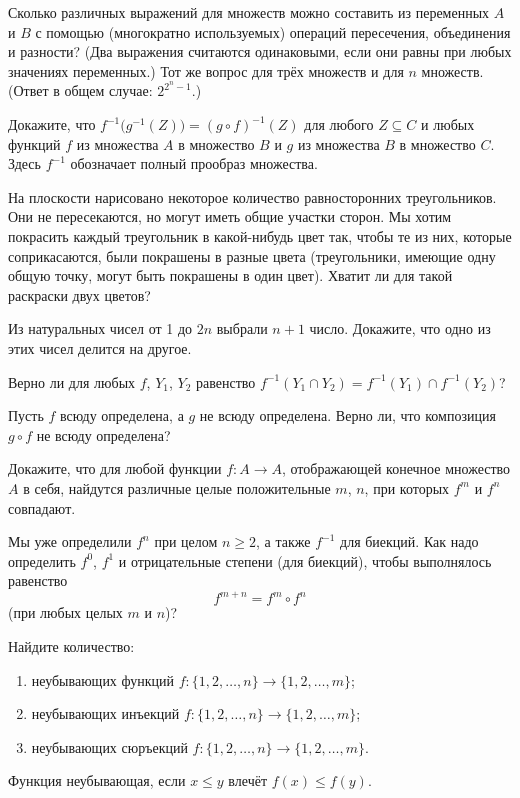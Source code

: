 \begin{problems}
\item Сколько различных выражений для множеств можно составить из переменных $A$ и $B$ с помощью (многократно используемых) операций пересечения, объединения и разности? (Два выражения считаются одинаковыми, если они равны при любых значениях переменных.) Тот же вопрос для трёх множеств и для $n$ множеств. (Ответ в общем случае: $2^{2^n-1}$.)

\item Докажите, что $f^{-1}\bigl(g^{-1}(Z)\bigr)=(g\circ f)^{-1}(Z)$ для любого $Z\subseteq C$ и любых функций $f$ из множества $A$ в множество $B$ и $g$ из множества $B$ в множество $C$. Здесь $f^{-1}$ обозначает полный прообраз множества.

\item На плоскости нарисовано некоторое количество равносторонних треугольников. Они не пересекаются, но могут иметь общие участки сторон. Мы хотим покрасить каждый треугольник в какой-нибудь цвет так, чтобы те из них, которые соприкасаются, были покрашены в разные цвета (треугольники, имеющие одну общую точку, могут быть покрашены в один цвет). Хватит ли для такой раскраски двух цветов?

\item Из натуральных чисел от 1 до $2n$ выбрали $n+1$ число. Докажите, что одно из этих чисел делится на другое.

\item Верно ли для любых $f$, $Y_1$, $Y_2$ равенство $f^{-1}(Y_1\cap Y_2)=f^{-1}(Y_1)\cap f^{-1}(Y_2)$?
 
\item Пусть $f$ всюду определена, а $g$ не всюду определена. Верно ли, что композиция $g\circ f$ не всюду определена?
 
\item Докажите, что для любой функции $f\colon A\to A$, отображающей конечное множество $A$ в себя, найдутся различные целые положительные $m$, $n$, при которых $f^m$ и $f^n$ совпадают.
 
\item Мы уже определили $f^n$ при целом $n\geqslant 2$, а также $f^{-1}$ для биекций. Как надо определить $f^0$, $f^1$ и отрицательные степени (для биекций), чтобы выполнялось равенство
\[
f^{m+n}=f^m\circ f^n
\]
(при любых целых $m$ и $n$)?

 \item Найдите количество:
\begin{enumerate}
  \item[a)] неубывающих функций $f\colon\{1,2,\ldots,n\}\to\{1,2,\ldots,m\}$;
  \item[b)] неубывающих инъекций $f\colon\{1,2,\ldots,n\}\to\{1,2,\ldots,m\}$;
  \item[c)] неубывающих сюръекций $f\colon\{1,2,\ldots,n\}\to\{1,2,\ldots,m\}$.
\end{enumerate}
Функция неубывающая, если $x\leqslant y$ влечёт $f(x)\leqslant f(y)$.


\end{problems}
